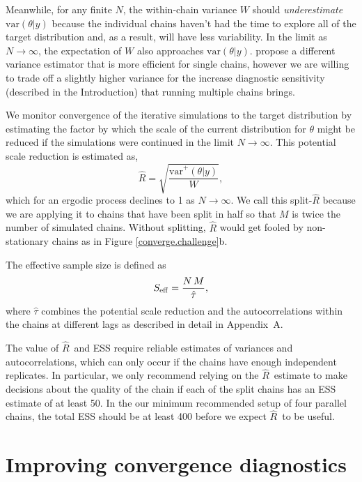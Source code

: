 \documentclass[american,]{article}
\newcommand{\Rhat}{$\widehat{R}$}
\theoremstyle{definition}
\begin{document}
Meanwhile, for any finite \(N\), the within-chain variance \(W\) should
\emph{underestimate} \(\mbox{var}(\theta |y)\) because the
individual chains haven't had the time to explore all of the target
distribution and, as a result, will have less variability. In the limit
as \(N\rightarrow\infty\), the expectation of \(W\) also approaches
\(\mbox{var}(\theta |y)\). \citet{vats2018revisiting} propose a different variance estimator that is more efficient for single chains, however we are willing to trade off a slightly higher variance for the increase diagnostic sensitivity (described in the Introduction) that running multiple chains brings.

We monitor convergence of the iterative simulations to the target
distribution by estimating the factor by which the scale of the current
distribution for \(\theta\) might be reduced if the simulations were
continued in the limit \(N\rightarrow\infty\). This potential scale
reduction is estimated as,
\begin{equation}
\widehat{R} = \sqrt{\frac{\widehat{\mbox{var}}^+(\theta | y)}{W}},
\end{equation}
which for an ergodic process declines to 1 as \(N\rightarrow\infty\). We call this
split-\(\widehat{R}\) because we are applying it to chains that
have been split in half so that \(M\) is twice the number of simulated
chains. Without splitting, \(\widehat{R}\) would get fooled by
non-stationary chains as in Figure \ref{converge.challenge}b.

The effective sample size is defined as 
\begin{equation}
S_{\rm eff} = \frac{N \, M}{\hat{\tau}},
\end{equation}
where $\hat{\tau}$ combines the potential scale reduction and the
autocorrelations within the chains at different lags as described in
detail in Appendix~A.

The value of \Rhat\ and ESS require reliable estimates of variances and autocorrelations, which can
only occur if the chains have enough independent replicates. In particular, we only recommend 
relying on the \Rhat\ estimate to make decisions about the quality of the chain if each of the 
split chains has an ESS estimate of at least 50. In the our minimum recommended setup of four
parallel chains, the total ESS should be at least 400 before we expect  \Rhat\ to be useful.


\hypertarget{improving-convergence-diagnostics}{%
\section{Improving convergence
diagnostics}\label{improving-convergence-diagnostics}}
\end{document}
